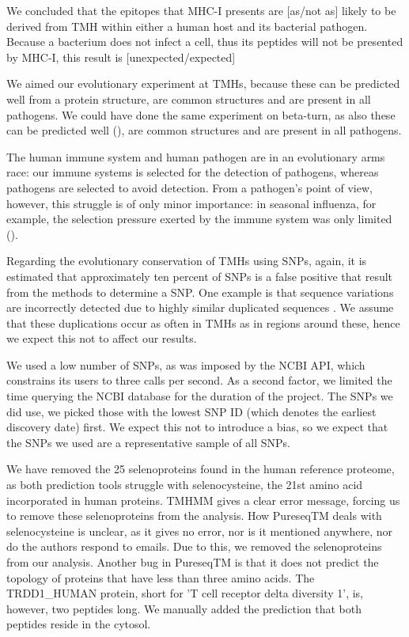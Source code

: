 We concluded that the
epitopes that MHC-I presents are [as/not as] likely 
to be derived from TMH within either a human host and its bacterial pathogen.
Because a bacterium does not infect a cell, thus its peptides
will not be presented by MHC-I, this result is [unexpected/expected]

We aimed our evolutionary experiment at TMHs, because these can
be predicted well from a protein structure,
are common structures and are present in all pathogens. 
We could have done the same experiment on beta-turn,
as also these can be predicted well (\cite{petersen2010netturnp}),
are common structures and are present in all pathogens.

The human immune system and human pathogen are in an evolutionary
arms race: our immune systems is selected for the detection
of pathogens, whereas pathogens are selected to avoid detection.
From a pathogen's point of view, however, this struggle 
is of only minor importance:
in seasonal influenza, for example, the selection pressure
exerted by the immune system was only limited (\cite{han2019individual}).

Regarding the evolutionary conservation of TMHs using SNPs,
again, it is estimated that approximately ten percent
of SNPs is a false positive that result from the methods to determine
a SNP. One example is that sequence variations are incorrectly
detected due to highly similar duplicated sequences \cite{musumeci2010single}.
We assume that these duplications occur as often in TMHs as in
regions around these, hence we expect this not to affect our results.

We used a low number of SNPs, as was imposed by the
NCBI API, which constrains its users to three calls per second.
As a second factor, we limited the time querying the NCBI database
for the duration of the project.
The SNPs we did use, we picked those
with the lowest SNP ID (which denotes the earliest discovery date) first.
We expect this not to introduce a bias, so we expect that
the SNPs we used are a representative sample of all SNPs.

We have removed the 25 selenoproteins found in the human
reference proteome, as both prediction tools struggle with 
selenocysteine, the 21st amino acid incorporated in human proteins.
TMHMM gives a clear error message, forcing us to remove
these selenoproteins from the analysis.
How PureseqTM deals with selenocysteine is unclear,
as it gives no error, nor is it mentioned anywhere,
nor do the authors respond to emails. Due to this, we removed the
selenoproteins from our analysis.
Another bug in PureseqTM is that it does not predict the topology
of proteins that have less than three amino acids. 
The TRDD1\_HUMAN protein, short for 'T cell receptor delta diversity 1',
is, however, two peptides long. We manually added the prediction
that both peptides reside in the cytosol.


